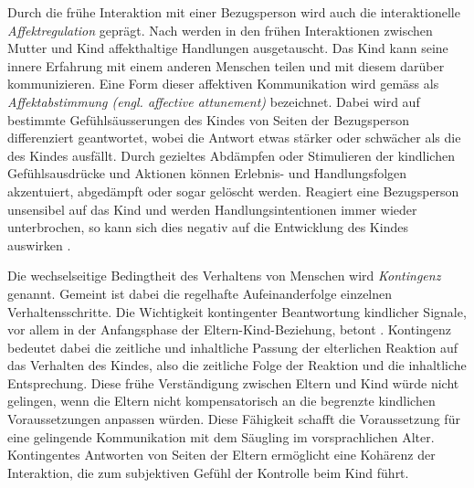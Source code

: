 Durch die frühe Interaktion mit einer Bezugsperson wird auch die interaktionelle \textit{Affektregulation} geprägt. Nach  werden in den frühen Interaktionen zwischen Mutter und Kind affekthaltige Handlungen ausgetauscht. Das Kind kann seine innere Erfahrung mit einem anderen Menschen teilen und mit diesem darüber kommunizieren. Eine Form dieser affektiven Kommunikation wird gemäss  als \textit{Affektabstimmung (engl. affective attunement)} bezeichnet. Dabei wird auf bestimmte Gefühlsäusserungen des Kindes von Seiten der Bezugsperson differenziert geantwortet, wobei die Antwort etwas stärker oder schwächer als die des Kindes ausfällt. Durch gezieltes Abdämpfen oder Stimulieren der kindlichen Gefühlsausdrücke und Aktionen können Erlebnis- und Handlungsfolgen akzentuiert, abgedämpft oder sogar gelöscht werden. Reagiert eine Bezugsperson unsensibel auf das Kind und werden Handlungsintentionen immer wieder unterbrochen, so kann sich dies negativ auf die Entwicklung des Kindes auswirken \cite{Resch1999}.

Die wechselseitige Bedingtheit des Verhaltens von Menschen wird \textit{Kontingenz} genannt. Gemeint ist dabei die regelhafte Aufeinanderfolge einzelnen Verhaltensschritte. Die Wichtigkeit kontingenter Beantwortung kindlicher Signale, vor allem in der Anfangsphase der Eltern-Kind-Beziehung, betont . Kontingenz bedeutet dabei die zeitliche und inhaltliche Passung der elterlichen Reaktion auf das Verhalten des Kindes, also die zeitliche Folge der Reaktion und die inhaltliche Entsprechung. Diese frühe Verständigung zwischen Eltern und Kind würde nicht gelingen, wenn die Eltern nicht kompensatorisch an die begrenzte kindlichen Voraussetzungen anpassen würden. Diese Fähigkeit schafft die Voraussetzung für eine gelingende Kommunikation mit dem Säugling im vorsprachlichen Alter. Kontingentes Antworten von Seiten der Eltern ermöglicht eine Kohärenz der Interaktion, die zum subjektiven Gefühl der Kontrolle beim Kind führt.

